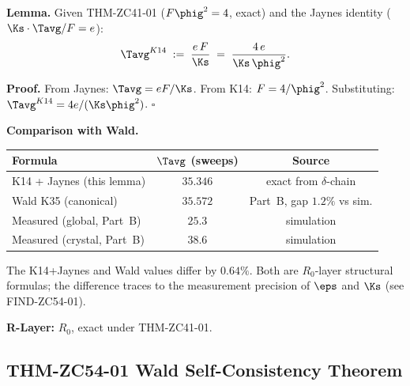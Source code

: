 \documentclass[12pt, a4paper]{article}
\begin{document}
\begin{formalbox}[title={LEM-ZC54-02: K14 + Jaynes Predicts
  $T_{\rm avg}^{K14} = 4e/(K^*\varphi_{\rm gold}^2)$ (Exact)}]
\textbf{Lemma.}
Given THM-ZC41-01 ($F\phig^2 = 4$, exact) and the Jaynes
identity ($\Ks\cdot\Tavg/F = e$):
\begin{equation}\label{zc54:eq:tavg-k14}
  \Tavg^{K14}
  \;:=\; \frac{e\,F}{\Ks}
  \;=\; \frac{4\,e}{\Ks\,\phig^2}.
\end{equation}

\textbf{Proof.}
From Jaynes: $\Tavg = eF/\Ks$. From K14: $F = 4/\phig^2$.
Substituting: $\Tavg^{K14} = 4e/(\Ks\phig^2)$. \hfill$\square$

\textbf{Comparison with Wald.}
\begin{center}
\begin{tabular}{@{}lcc@{}}
\toprule
Formula & $\Tavg$ (sweeps) & Source \\
\midrule
K14 + Jaynes (this lemma) & $35.346$ & exact from $\delta$-chain \\
Wald K35 (canonical) & $35.572$ & Part~B, gap $1.2\%$ vs sim.\\
Measured (global, Part~B) & $25.3$ & simulation \\
Measured (crystal, Part~B) & $38.6$ & simulation \\
\bottomrule
\end{tabular}
\end{center}

The K14+Jaynes and Wald values differ by $0.64\%$.
Both are $R_0$-layer structural formulas; the difference
traces to the measurement precision of $\eps$ and $\Ks$
(see FIND-ZC54-01).

\textbf{R-Layer:} $R_0$, exact under THM-ZC41-01.
\end{formalbox}

\subsection{THM-ZC54-01 \quad Wald Self-Consistency Theorem}
\label{zc54:sec:thm01}

\end{document}
